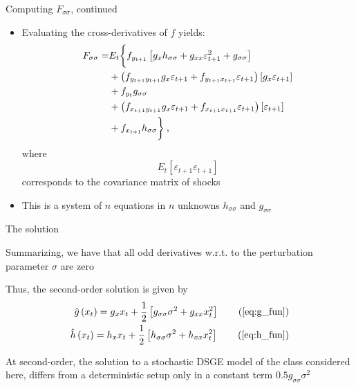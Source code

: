 \begin{frame}{Computing $F_{\sigma\sigma}$, continued}
  \begin{itemize}
    \item Evaluating the cross-derivatives of $f$ yields:
          \begin{align}
            {F_{\sigma \sigma }} = & {E_t}\biggl\{ {f_{{y_{t + 1}}}}\left[ {{g_x}{h_{\sigma \sigma }} + {g_{xx}}\varepsilon _{t + 1}^2 + {g_{\sigma \sigma }}} \right] \notag                                           \\
                                   & + \left( {{f_{{y_{t + 1}}{y_{t + 1}}}}{g_x}{\varepsilon _{t + 1}} + {f_{{y_{t + 1}}{x_{t + 1}}}}{\varepsilon _{t + 1}}} \right)\left[ {{g_x}{\varepsilon _{t + 1}}} \right] \notag \\
                                   & + {f_{{y_t}}}{g_{\sigma \sigma }} \notag                                                                                                                                           \\
                                   & + \left( {{f_{{x_{t + 1}}{y_{t + 1}}}}{g_x}{\varepsilon _{t + 1}} + {f_{{x_{t + 1}}{x_{t + 1}}}}{\varepsilon _{t + 1}}} \right)\left[ {{\varepsilon _{t + 1}}} \right] \notag      \\
                                   & + {f_{{x_{t + 1}}}}{h_{\sigma \sigma }}\biggr\}  \: ,
          \end{align}
          where
          \[
            E_t[\varepsilon_{t+1}\varepsilon_{t+1}]
          \]
          corresponds to the covariance matrix of shocks
    \item This is a system of $n$ equations in $n$ unknowns $h_{\sigma\sigma}$ and $g_{\sigma\sigma}$
  \end{itemize}
\end{frame}

\begin{frame}{The solution}
  \begin{witemize}
    \item Summarizing, we have that all odd derivatives w.r.t. to the perturbation parameter $\sigma$ are zero
    \item Thus, the second-order solution is given by
    \begin{align}
      \hat g\left( {{x_t}} \right) = {g_x}{x_t} +\frac{1}{2}\left[ {g_{\sigma \sigma }}{\sigma ^2} + {g_{xx}}x_t^2 \right] \tag{\ref{eq:g_fun}} \\
      \hat h\left( {{x_t}} \right) = {h_x}{x_t} +\frac{1}{2}\left[ {h_{\sigma \sigma }}{\sigma ^2} + {h_{xx}}x_t^2 \right] \tag{\ref{eq:h_fun}}
    \end{align}
    \item At second-order, the solution to a stochastic DSGE model of the class considered here, differs from a deterministic setup only in a constant term $0.5 g_{\sigma\sigma}\sigma^2$
  \end{witemize}
\end{frame}

